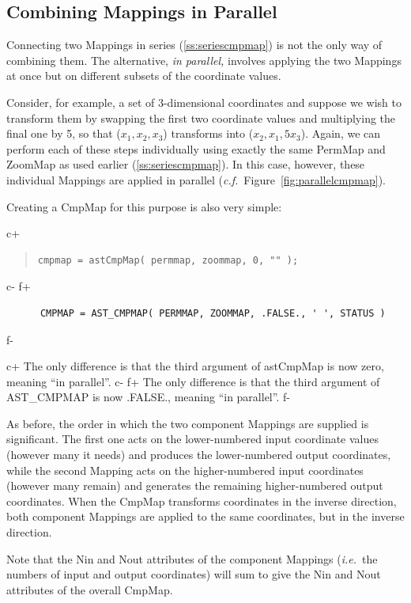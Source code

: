 \documentclass[twoside,11pt]{article}
\newcommand{\secref}[1]{\S\ref{#1}}
\renewcommand{\secref}[1]{\ref{#1}}
\begin{document}
\subsection{Combining Mappings in Parallel}

Connecting two Mappings in series (\secref{ss:seriescmpmap}) is not the
only way of combining them. The alternative, {\em{in parallel,}}
involves applying the two Mappings at once but on different subsets of
the coordinate values.

Consider, for example, a set of 3-dimensional coordinates and suppose
we wish to transform them by swapping the first two coordinate values
and multiplying the final one by 5, so that ($x_1,x_2,x_3$) transforms
into ($x_2,x_1,5x_3$). Again, we can perform each of these steps
individually using exactly the same PermMap and ZoomMap as used
earlier (\secref{ss:seriescmpmap}). In this case, however, these
individual Mappings are applied in parallel
({\em{c.f.}}\ Figure~\ref{fig:parallelcmpmap}).

Creating a CmpMap for this purpose is also very simple:

c+
\begin{quote}
\small
\begin{verbatim}
cmpmap = astCmpMap( permmap, zoommap, 0, "" );
\end{verbatim}
\normalsize
\end{quote}
c-
f+
\small
\begin{verbatim}
      CMPMAP = AST_CMPMAP( PERMMAP, ZOOMMAP, .FALSE., ' ', STATUS )
\end{verbatim}
\normalsize
f-

c+
The only difference is that the third argument of astCmpMap is now
zero, meaning ``in parallel''.
c-
f+
The only difference is that the third argument of AST\_CMPMAP is now
.FALSE., meaning ``in parallel''.
f-

As before, the order in which the two component Mappings are supplied
is significant. The first one acts on the lower-numbered input
coordinate values (however many it needs) and produces the
lower-numbered output coordinates, while the second Mapping acts on
the higher-numbered input coordinates (however many remain) and
generates the remaining higher-numbered output coordinates.  When the
CmpMap transforms coordinates in the inverse direction, both component
Mappings are applied to the same coordinates, but in the inverse
direction.

Note that the Nin and Nout attributes of the component Mappings
({\em{i.e.}}\ the numbers of input and output coordinates) will sum to
give the Nin and Nout attributes of the overall CmpMap.
\end{document}
